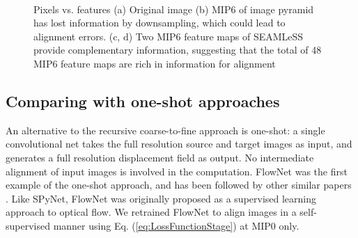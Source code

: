 \documentclass{article}
\begin{document}
\begin{figure}[htp]
	\centering
	 \\
	\caption{Pixels vs. features (a) Original image (b) MIP6 of image pyramid has lost information by downsampling, which could lead to alignment errors. (c, d) Two MIP6 feature maps of SEAMLeSS provide complementary information, suggesting that the total of 48 MIP6 feature maps are rich in information for alignment}\label{fms}
\end{figure}

\subsection{Comparing with one-shot approaches}
An alternative to the recursive coarse-to-fine approach is one-shot: a single convolutional net takes the full resolution source and target images as input, and generates a full resolution displacement field as output. No intermediate alignment of input images is involved in the computation. FlowNet \citep{flownet} was the first example of the one-shot approach, and has been followed by other similar papers \citep{balakrishnan2018unsupervised, yoo2017ssemnet, Unflow, WarpNet}. Like SPyNet, FlowNet was originally proposed as a supervised learning approach to optical flow. We retrained FlowNet to align images in a self-supervised manner using Eq. (\ref{eq:LossFunctionStage}) at MIP0 only. 
\end{document}
